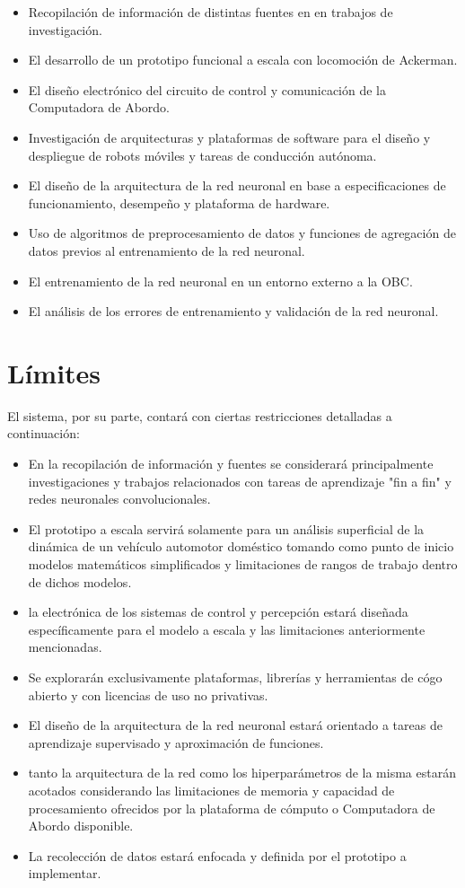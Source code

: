 \documentclass[12pt,letterpaper]{article}
\begin{document}
\begin{itemize}
    \item Recopilación de información de distintas fuentes en 
    en trabajos de investigación.
    \item El desarrollo de un prototipo funcional a escala con 
    locomoción de Ackerman.
    \item El diseño electrónico del circuito de control y comunicación de
    la Computadora de Abordo.
    \item Investigación de arquitecturas y plataformas de software para el
    diseño y despliegue de robots móviles y tareas de conducción autónoma.
    \item El diseño de la arquitectura de la red neuronal en base a 
    especificaciones de funcionamiento, desempeño y plataforma de hardware.
    \item Uso de algoritmos de preprocesamiento de datos y funciones
    de agregación de datos previos al entrenamiento de la red neuronal.
    \item El entrenamiento de la red neuronal en un entorno externo a la OBC.
    \item El análisis de los errores de entrenamiento y validación de la red neuronal.

\end{itemize}

\section{Límites}
El sistema, por su parte, contará con ciertas restricciones detalladas a 
continuación:
\begin{itemize}
    \item En la recopilación de información y fuentes se 
    considerará principalmente investigaciones y trabajos relacionados
    con tareas de aprendizaje "fin a fin" y redes neuronales convolucionales.
    \item El prototipo a escala servirá solamente para un análisis superficial 
    de la dinámica de un vehículo automotor doméstico tomando como punto 
    de inicio modelos matemáticos simplificados y limitaciones de rangos de trabajo dentro 
    de dichos modelos.
    \item la electrónica de los sistemas de control y percepción estará 
    diseñada específicamente para el modelo a escala y las limitaciones anteriormente
    mencionadas.
    \item Se explorarán exclusivamente plataformas, librerías y herramientas
    de cógo abierto y con licencias de uso no privativas.
    \item El diseño de la arquitectura de la red neuronal estará orientado a 
    tareas de aprendizaje supervisado y aproximación de funciones.
    \item tanto la arquitectura de la red como los hiperparámetros de 
    la misma estarán acotados considerando las limitaciones de memoria y capacidad 
    de procesamiento ofrecidos por la plataforma de cómputo o Computadora
    de Abordo disponible.
    \item La recolección de datos estará enfocada y definida por el prototipo
    a implementar.
\end{itemize}
\end{document}
